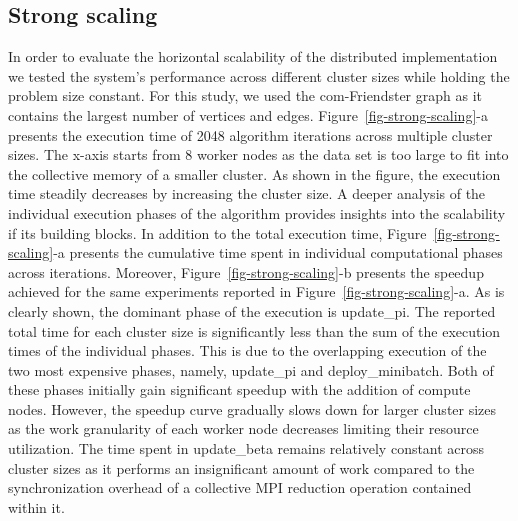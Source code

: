 \subsection{Strong scaling}

\begin{figure*}[t] %
  \centering
  \caption{(a) Execution time of 2048 algorithm iterations for the
  same problem size (com-Friendster, K=1024, M=16384 n=32) across different
  cluster sizes. (b) Speedup achieved for same experiments in (a) with respect to
  8-nodes}
  \label{fig-strong-scaling}
\end{figure*}

In order to evaluate the horizontal scalability of the distributed
implementation we tested the system's performance across different cluster
sizes while holding the problem size constant. For this study, we used the
com-Friendster graph as it contains the largest number of vertices and edges.
%
Figure~\ref{fig-strong-scaling}-a presents the execution time of 2048 algorithm
iterations across multiple cluster sizes. The x-axis starts from 8 worker nodes
as the data set is too large to fit into the collective memory of a smaller
cluster.
%
As shown in the figure, the execution
time steadily decreases by increasing the cluster size.
A deeper analysis of the individual execution phases of the algorithm provides
insights into the scalability if its building blocks.
%
In addition to the total execution time, Figure~\ref{fig-strong-scaling}-a
presents the cumulative time spent in individual computational phases across
iterations. Moreover, Figure~\ref{fig-strong-scaling}-b presents the speedup
achieved for the same experiments reported in
Figure~\ref{fig-strong-scaling}-a. As is clearly shown, the dominant phase of
the execution is update\_pi.
The reported total time for each cluster size is significantly less than the
sum of the execution times of the individual phases. This is due to the
overlapping execution of the two most expensive phases, namely, update\_pi and
deploy\_minibatch. Both of these phases initially gain significant speedup with the
addition of compute nodes. However, the speedup curve gradually slows down for
larger cluster sizes as the work granularity of each worker node decreases
limiting their resource utilization.
%
The time spent in update\_beta remains relatively constant across cluster sizes
as it performs an insignificant amount of work compared to the synchronization
overhead of a collective MPI reduction operation contained within it.

